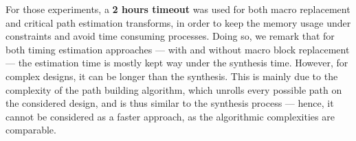         \begin{table}[h!]
            \caption[Timing estimations over GEMM implementations]{Timing estimations over GEMM\textsuperscript{\styx} implementations (Fig. \ref{ch.expe:sec.strategies:ssec.timing:fig.gemm})}
            \label{ch.expe:sec.estimators:ssec.timing:table.gemm}
        \end{table}

       For those experiments, a {\bf 2 hours timeout} was used for both macro replacement and critical path estimation transforms, in order to keep the memory usage under constraints and avoid time consuming processes.
       Doing so, we remark that for both timing estimation approaches --- \ie with and without macro block replacement --- the estimation time is mostly kept way under the synthesis time.
       However, for complex designs, it can be longer than the synthesis.
       This is mainly due to the complexity of the path building algorithm, which unrolls every possible path on the considered design, and is thus similar to the synthesis process --- hence, it cannot be considered as a faster approach, as the algorithmic complexities are comparable.

